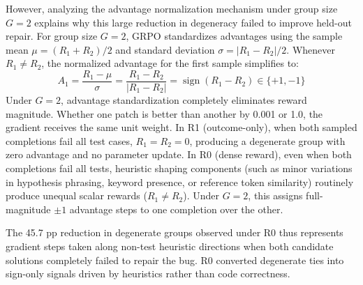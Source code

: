 \documentclass{article}
\begin{document}
However, analyzing the advantage normalization mechanism under group size $G=2$ explains why this large reduction in degeneracy failed to improve held-out repair. For group size $G=2$, GRPO standardizes advantages using the sample mean $\mu = (R_1 + R_2)/2$ and standard deviation $\sigma = |R_1 - R_2|/2$. Whenever $R_1 \ne R_2$, the normalized advantage for the first sample simplifies to:
\begin{equation}
A_1 = \frac{R_1 - \mu}{\sigma} = \frac{R_1 - R_2}{|R_1 - R_2|} = \operatorname{sign}(R_1 - R_2) \in \{+1, -1\}
\end{equation}
Under $G=2$, advantage standardization completely eliminates reward magnitude. Whether one patch is better than another by 0.001 or 1.0, the gradient receives the same unit weight. In R1 (outcome-only), when both sampled completions fail all test cases, $R_1 = R_2 = 0$, producing a degenerate group with zero advantage and no parameter update. In R0 (dense reward), even when both completions fail all tests, heuristic shaping components (such as minor variations in hypothesis phrasing, keyword presence, or reference token similarity) routinely produce unequal scalar rewards ($R_1 \ne R_2$). Under $G=2$, this assigns full-magnitude $\pm 1$ advantage steps to one completion over the other. 

The 45.7 pp reduction in degenerate groups observed under R0 thus represents gradient steps taken along non-test heuristic directions when both candidate solutions completely failed to repair the bug. R0 converted degenerate ties into sign-only signals driven by heuristics rather than code correctness.
\end{document}
